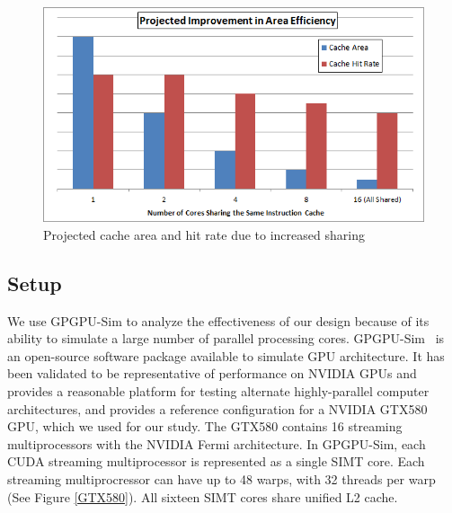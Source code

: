 \begin{figure}
\centering
\includegraphics[width=\columnwidth]{graphics/AreaEff.png}
\caption{Projected cache area and hit rate due to increased sharing}
\label{AreaEff}
\end{figure}

\subsection{Setup}

We use GPGPU-Sim to analyze the effectiveness of our design because of
its ability to simulate a large number of parallel processing cores.
GPGPU-Sim~\cite{bakhodayuan09} is an open-source software package
available to simulate GPU architecture. 
It has been validated to be representative of performance on NVIDIA
GPUs and provides a reasonable platform for testing alternate
highly-parallel computer architectures, and provides a reference
configuration for a NVIDIA GTX580 GPU, which we used for our study.
The GTX580 contains 16 streaming multiprocessors with the NVIDIA Fermi
architecture. 
In GPGPU-Sim, each CUDA streaming multiprocessor is represented as a
single SIMT core. 
Each streaming multiprocressor can have up to 48 warps, with 32
threads per warp (See Figure \ref{GTX580}). 
All sixteen SIMT cores share unified L2 cache.



